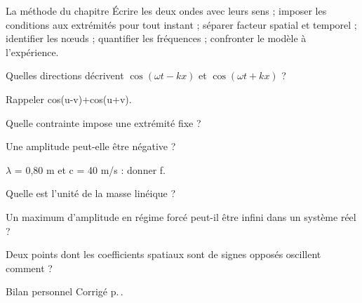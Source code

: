 \begin{methode}{La méthode du chapitre}
Écrire les deux ondes avec leurs sens ; imposer les conditions aux extrémités pour tout instant ; séparer facteur spatial et temporel ; identifier les nœuds ; quantifier les fréquences ; confronter le modèle à l’expérience.
\end{methode}


\begin{questions}
\item Quelles directions décrivent $\cos(\omega t-kx)$ et $\cos(\omega t+kx)$ ?
\item Rappeler cos(u-v)+cos(u+v).
\item Quelle contrainte impose une extrémité fixe ?
\item Une amplitude peut-elle être négative ?
\item \ensuremath{\lambda} = 0,80 m et c = 40 m/s : donner f.
\item Quelle est l’unité de la masse linéique ?
\item Un maximum d’amplitude en régime forcé peut-il être infini dans un système réel ?
\item Deux points dont les coefficients spatiaux sont de signes opposés oscillent comment ?
\end{questions}
\begin{docu}{Bilan personnel}
Corrigé p.\,\pageref{corr-diag}.
\end{docu}


